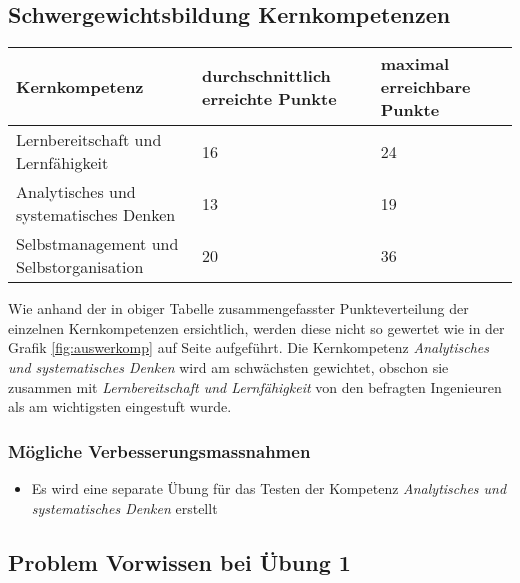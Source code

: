 \subsection{Schwergewichtsbildung Kernkompetenzen}
\begin{center}
  \begin{tabular}{ | p{7cm} | p{3cm} | p{3cm} |}
   \hline
   \textbf{Kernkompetenz} & \textbf{durchschnittlich erreichte Punkte} & \textbf{maximal erreichbare Punkte} \\ \hline
   Lernbereitschaft und Lernfähigkeit & 16 & 24\\ \hline
   Analytisches und systematisches Denken & 13 & 19\\ \hline
   Selbstmanagement und Selbstorganisation & 20 & 36\\ \hline
  \end{tabular}
\end{center}
Wie anhand der in obiger Tabelle zusammengefasster Punkteverteilung der einzelnen Kernkompetenzen ersichtlich, werden diese nicht so gewertet wie in der Grafik \ref{fig:auswerkomp} auf Seite \pageref{fig:auswerkomp} aufgeführt. Die Kernkompetenz \textit{Analytisches und systematisches Denken} wird am schwächsten gewichtet, obschon sie zusammen mit \textit{Lernbereitschaft und Lernfähigkeit} von den befragten Ingenieuren als am wichtigsten eingestuft wurde.
\subsubsection{Mögliche Verbesserungsmassnahmen}
\begin{itemize}
\item Es wird eine separate Übung für das Testen der Kompetenz \textit{Analytisches und systematisches Denken} erstellt
\end{itemize}
\subsection{Problem Vorwissen bei Übung 1}

